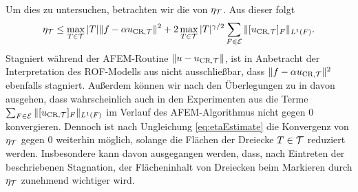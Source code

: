 Um dies zu untersuchen, betrachten wir die  von
$\eta_{\mathcal{T}}$.
Aus dieser folgt
\begin{align}
  \label{eq:etaEstimate}
  \eta_{\mathcal{T}} 
  \leq
  \max_{T\in\mathcal{T}}|T|\Vert f-\alpha u_{\textup{CR}, \mathcal{T}}\Vert^2
  + 2\max_{T\in\mathcal{T}}|T|^{\gamma/2}\sum_{F\in\mathcal{E}}\Vert[u_{\textup{CR}, \mathcal{T}}]_F\Vert_{L^1(F)}.
\end{align}
Stagniert während der AFEM-Routine $\Vert u-u_{\textup{CR}, \mathcal{T}}\Vert$, ist in Anbetracht
der Interpretation des ROF-Modells aus  nicht
ausschließbar, dass $\Vert f-\alpha u_{\textup{CR}, \mathcal{T}}\Vert^2$ ebenfalls stagniert.
Außerdem können wir nach den Überlegungen zu  in
 davon ausgehen,
dass wahrscheinlich auch in den Experimenten aus
 die Terme
$\sum_{F\in\mathcal{E}}\Vert[u_{\textup{CR}, \mathcal{T}}]_F\Vert_{L^1(F)}$ im Verlauf des AFEM-Algorithmus
nicht gegen $0$ konvergieren.
Dennoch ist nach Ungleichung \eqref{eq:etaEstimate} die Konvergenz von $\eta_{\mathcal{T}}$
gegen $0$ weiterhin möglich, solange die Flächen der Dreiecke $T\in\mathcal{T}$
reduziert werden.  
Insbesondere kann davon ausgegangen werden, dass, nach Eintreten der 
beschriebenen Stagnation, der Flächeninhalt von Dreiecken beim Markieren durch 
$\eta_{\mathcal{T}}$ zunehmend wichtiger wird.
